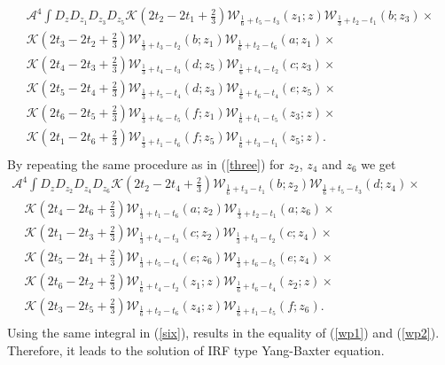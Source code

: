 \documentclass[a4paper,11pt]{article}%
\numberwithin{equation}{section}
\begin{document}
 \begin{multline}\label{wp1}
   \mathcal{A}^4 \int D_z D_{z_1} D_{z_3}D_{z_5}   \mathcal{K}(2t_2-2t_1+\frac{2}{3}) \mathcal{W}_{\frac{1}{6}+t_5-t_3}(z_1; z)  \mathcal{W}_{\frac{1}{3}+t_2-t_1}(b; z_3)      \times  \\ 
   \mathcal{K}(2t_3-2t_2+\frac{2}{3})  \mathcal{W}_{\frac{1}{3}+t_3-t_2}(b;z_1)  \mathcal{W}_{\frac{1}{6}+t_2-t_6}(a; z_1) \times \\ 
   \mathcal{K}(2t_4-2t_3+\frac{2}{3}) \mathcal{W}_{\frac{1}{3}+t_4-t_3}(d;z_5)   \mathcal{W}_{\frac{1}{6}+t_4-t_2}(c;z_3) \times \\ 
    \mathcal{K}(2t_5-2t_4+\frac{2}{3})  \mathcal{W}_{\frac{1}{3}+t_5-t_4}(d; z_3) \mathcal{W}_{\frac{1}{6}+t_6-t_4}(e; z_5) \times \\ 
   \mathcal{K}(2t_6-2t_5+\frac{2}{3})  \mathcal{W}_{\frac{1}{3}+t_6-t_5}(f; z_1) \mathcal{W}_{\frac{1}{6}+t_1-t_5}(z_3; z) \times \\ 
   \mathcal{K}(2t_1-2t_6+\frac{2}{3}) \mathcal{W}_{\frac{1}{3}+t_1-t_6}(f;z_5)  \mathcal{W}_{\frac{1}{6}+t_3-t_1}(z_5; z). \\
      \end{multline}
 By repeating the same procedure as in (\ref{three}) for $z_2$, $z_4$ and $z_6$ we get 
 \begin{multline}\label{wp2}
     \mathcal{A}^4 \int D_z D_{z_2} D_{z_4}D_{z_6} \mathcal{K}(2t_2-2t_4+\frac{2}{3})  \mathcal{W}_{\frac{1}{6}+t_3-t_1}(b;z_2)
     \mathcal{W}_{\frac{1}{6}+t_5-t_3}(d; z_4)  \times \qquad\qquad\qquad\,\qquad\\
\,\,\,\,\,\,\mathcal{K}(2t_4-2t_6+\frac{2}{3})     \mathcal{W}_{\frac{1}{3}+t_1-t_6}(a; z_2) \mathcal{W}_{\frac{1}{3}+t_2-t_1}(a; z_6)  \times\\
         \,\,\,\,\,\,  \mathcal{K}(2t_1-2t_3+\frac{2}{3})     \mathcal{W}_{\frac{1}{3}+t_4-t_3}(c; z_2) \mathcal{W}_{\frac{1}{3}+t_3-t_2}(c; z_4) \times\\
          \,\,\,\,\,\,\mathcal{K}(2t_5-2t_1+\frac{2}{3})  \mathcal{W}_{\frac{1}{3}+t_5-t_4}(e;z_6)    \mathcal{W}_{\frac{1}{3}+t_6-t_5}(e;z_4)  \times\\
           \,\,\,\,\,\, \mathcal{K}(2t_6-2t_2+\frac{2}{3}) \mathcal{W}_{\frac{1}{6}+t_4-t_2}(z_1; z) \mathcal{W}_{\frac{1}{6}+t_6-t_4}(z_2; z)  \times\\ \,\,\,\,\,\,\mathcal{K}(2t_3-2t_5+\frac{2}{3}) \mathcal{W}_{\frac{1}{6}+t_2-t_6}(z_4;z)\mathcal{W}_{\frac{1}{6}+t_1-t_5}(f;z_6).  \\
 \end{multline}
Using the same integral in (\ref{six}), results in the equality of (\ref{wp1}) and (\ref{wp2}). Therefore, it leads to the solution of IRF type Yang-Baxter equation.




\end{document}
